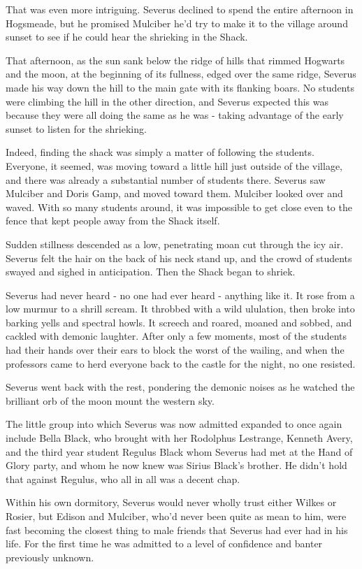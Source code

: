 \documentclass[a4paper,11pt]{article}
\begin{document}
That was even more intriguing. Severus declined to spend the entire afternoon in Hogsmeade, but he promised Mulciber he'd try to make it to the village around sunset to see if he could hear the shrieking in the Shack.

That afternoon, as the sun sank below the ridge of hills that rimmed Hogwarts and the moon, at the beginning of its fullness, edged over the same ridge, Severus made his way down the hill to the main gate with its flanking boars. No students were climbing the hill in the other direction, and Severus expected this was because they were all doing the same as he was - taking advantage of the early sunset to listen for the shrieking.

Indeed, finding the shack was simply a matter of following the students. Everyone, it seemed, was moving toward a little hill just outside of the village, and there was already a substantial number of students there. Severus saw Mulciber and Doris Gamp, and moved toward them. Mulciber looked over and waved. With so many students around, it was impossible to get close even to the fence that kept people away from the Shack itself.

Sudden stillness descended as a low, penetrating moan cut through the icy air. Severus felt the hair on the back of his neck stand up, and the crowd of students swayed and sighed in anticipation. Then the Shack began to shriek.

Severus had never heard - no one had ever heard - anything like it. It rose from a low murmur to a shrill scream. It throbbed with a wild ululation, then broke into barking yells and spectral howls. It screech and roared, moaned and sobbed, and cackled with demonic laughter. After only a few moments, most of the students had their hands over their ears to block the worst of the wailing, and when the professors came to herd everyone back to the castle for the night, no one resisted.

Severus went back with the rest, pondering the demonic noises as he watched the brilliant orb of the moon mount the western sky.

The little group into which Severus was now admitted expanded to once again include Bella Black, who brought with her Rodolphus Lestrange, Kenneth Avery, and the third year student Regulus Black whom Severus had met at the Hand of Glory party, and whom he now knew was Sirius Black's brother. He didn't hold that against Regulus, who all in all was a decent chap.

Within his own dormitory, Severus would never wholly trust either Wilkes or Rosier, but Edison and Mulciber, who'd never been quite as mean to him, were fast becoming the closest thing to male friends that Severus had ever had in his life. For the first time he was admitted to a level of confidence and banter previously unknown.
\end{document}
